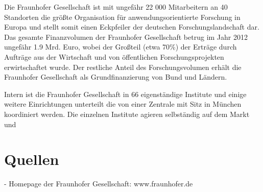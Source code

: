 \documentclass[a4paper, twoside]{scrartcl}
\begin{document}
Die Fraunhofer Gesellschaft ist mit ungefähr 22 000 Mitarbeitern an 40 Standorten die größte Organisation für anwendungsorientierte Forschung in Europa und stellt somit einen Eckpfeiler der deutschen Forschungslandschaft dar. 
Das gesamte Finanzvolumen der Fraunhofer Gesellschaft betrug im Jahr 2012  ungefähr 1.9 Mrd. Euro, wobei der Großteil (etwa 70\%) der Erträge durch Aufträge aus der Wirtschaft und von öffentlichen Forschungsprojekten erwirtschaftet wurde. Der restliche Anteil des Forschungsvolumen erhält die Fraunhofer Gesellschaft als Grundfinanzierung von Bund und Ländern. 

Intern ist die Fraunhofer Gesellschaft in 66 eigenständige Institute und einige weitere Einrichtungen unterteilt die von einer Zentrale mit Sitz in München koordiniert werden. Die einzelnen Institute agieren selbständig auf dem Markt und 





\section{Quellen}
\label{sec:quellen}

- Homepage der Fraunhofer Gesellschaft: www.fraunhofer.de
\end{document}
